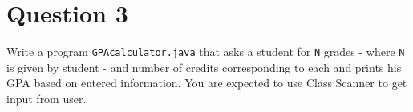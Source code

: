 \documentclass[12pt,letterpaper,twoside]{article}
\begin{document}
\section*{Question 3}

Write a program \texttt{GPAcalculator.java} that asks a student for \texttt{N} grades - where \texttt{N} is given by student - and number of credits corresponding to each and prints his GPA based on entered information. You are expected to use Class Scanner to get input from user.

\end{document}
